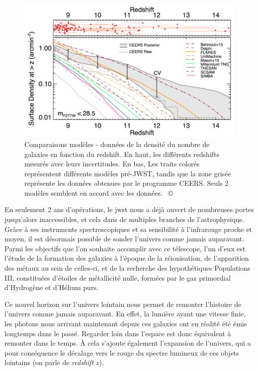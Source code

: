 \documentclass[11pt, a4paper]{article}
\newcommand{\customcite}[1]{\mbox{
  {\small \copyright} \cite{#1}}
}
\begin{document}
\begin{figure}
  \centering
  \includegraphics[scale=0.5]{assets/ceers_number_galaxies.png}
  \caption{Comparaisons modèles - données de la densité du nombre de galaxies en fonction du redshift. En haut, les différents redshifts mesurés avec leurs incertitudes. En bas, Les traits colorés représentent différents modèles pré-JWST, tandis que la zone grisée représente les données obtenues par le programme CEERS. Seuls 2 modèles semblent en accord avec les données. \customcite{2023arXiv231104279F}}
  \label{fig:densite_galaxies}
\end{figure}

En seulement 2 ans d'opérations, le \gls{jwst} nous a déjà ouvert de nombreuses portes jusqu'alors inaccessibles, et cela dans de multiples branches de l'astrophysique. Grâce à ses instruments spectroscopiques et sa sensibilité à l'infrarouge proche et moyen, il est désormais possible de sonder l'univers comme jamais auparavant. Parmi les objectifs que l'on souhaite accomplir avec ce télescope, l'un d'eux est l'étude de la formation des galaxies à l'époque de la réionisation, de l'apparition des métaux au sein de celles-ci, et de la recherche des hypothétiques Populations III, constituées d'étoiles de métallicité nulle, formées par le gaz primordial d'Hydrogène et d'Hélium purs.

Ce nouvel horizon sur l'univers lointain nous permet de remonter l'histoire de l'univers comme jamais auparavant. En effet, la lumière ayant une vitesse finie, les photons nous arrivant maintenant depuis ces galaxies ont en réalité été émis longtemps dans le passé. Regarder loin dans l'espace est donc équivalent à remonter dans le temps. À cela s'ajoute également l'expansion de l'univers, qui a pour conséquence le décalage vers le rouge du spectre lumineux de ces objets lointains (on parle de \textit{redshift} $z$).
\end{document}
